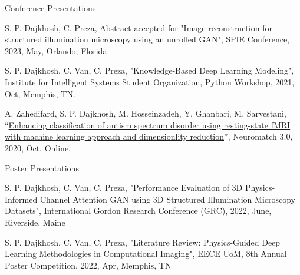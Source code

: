 

\begin{cventries}

  
  \cventry
    {} %
    {Conference Presentations} %
    {} %
    {} %
    {
      \begin{cvitems} %
        \item{S. P. Dajkhosh, C. Preza, Abstract accepted for "Image reconstruction for structured illumination microscopy using an unrolled GAN", SPIE Conference, 2023, May, Orlando, Florida.}
        \item{S. P. Dajkhosh, C. Van, C. Preza, "Knowledge-Based Deep Learning Modeling", Institute for Intelligent Systems Student Organization, Python Workshop, 2021, Oct, Memphis, TN.}
        \item{A. Zahedifard, S. P. Dajkhosh, M. Hosseinzadeh, Y. Ghanbari, M. Sarvestani, “\href{https://neural-reckoning.github.io/nmc3_provisional_schedule/abstracts/anis-zahedifard-enhancing-classification-of-autism-spectrum.html}{Enhancing classification of autism spectrum disorder using resting-state fMRI with machine learning approach and dimensionlity reduction}”, Neuromatch 3.0, 2020, Oct, Online.}
      \end{cvitems}
    }
  
  \cventry
    {} %
    {Poster Presentations} %
    {} %
    {} %
    {
      \begin{cvitems} %
        \item{S. P. Dajkhosh, C. Van, C. Preza, "Performance Evaluation of 3D Physics-Informed Channel Attention GAN using 3D Structured Illumination Microscopy Datasets", International Gordon Research Conference (GRC), 2022, June, Riverside, Maine}
        \item{S. P. Dajkhosh, C. Van, C. Preza, "Literature Review: Physics-Guided Deep Learning Methodologies in Computational Imaging", EECE UoM, 8th Annual Poster Competition, 2022, Apr, Memphis, TN}
      \end{cvitems}
    }
 

\end{cventries}
